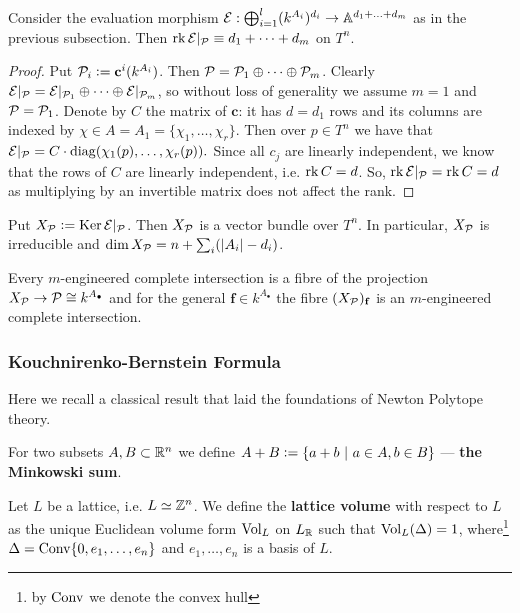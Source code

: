 \begin{claim}\label{claim:prelim_engin}
    Consider the evaluation morphism $\E : \bigoplus_{i = 1}^l (k^{A_i})^{d_i} \to \A^{d_1 + \hdots + d_m}$ as in the previous subsection. Then $\rk \E|_\P \equiv d_1 + \dots + d_m$ on $T^n$.
\end{claim}
\begin{proof}
Put $\P_i \defeq \mathbf c^i (k^{A_i})$. Then $\P = \P_1 \oplus \cdots \oplus \P_m$. Clearly $\E|_\P = \E|_{\P_1} \oplus \cdots \oplus \E|_{\P_m}$, so without loss of generality we assume $m = 1$ and $\P = \P_1$. Denote by $C$ the matrix of $\mathbf c$: it has $d = d_1$ rows and its columns are indexed by $\chi \in A = A_1 = \{ \chi_1, \dots, \chi_r \}$. Then over $p \in T^n$ we have that $\E|_\P = C \cdot \operatorname{diag}(\chi_1(p), \dots, \chi_r(p)).$ Since all $c_j$ are linearly independent, we know that the rows of $C$ are linearly independent, i.e. $\rk C = d$. So, $\rk \E|_\P = \rk C = d$ as multiplying by an invertible matrix does not affect the rank.
\end{proof}
\begin{corollary}
    Put $X_\P \defeq \Ker \E|_\P$. Then $X_\P$ is a vector bundle over $T^n$. In particular, $X_\P$ is irreducible and $\dim X_\P = n + \sum_i (|A_i| - d_i)$.
\end{corollary}

\begin{remark}
    Every $m$-engineered complete intersection is a fibre of the projection $X_\P \to \P \cong k^{A_\bullet}$ and for the general $\mathbf f \in k^{A_\bullet}$ the fibre $(X_\P)_{\mathbf f}$ is an $m$-engineered complete intersection.
\end{remark}

\subsubsection{Kouchnirenko-Bernstein Formula}
Here we recall a classical result that laid the foundations of Newton Polytope theory.
\begin{definition}
    For two subsets $A, B \subset \R^n$ we define $A + B \defeq \{ a + b\ |\ a \in A, b \in B\}$ --- \textbf{the Minkowski sum}.
\end{definition}

\begin{definition}
    Let $L$ be a lattice, i.e. $L \simeq \Z^n$. We define the \textbf{lattice volume} with respect to $L$ as the unique Euclidean volume form $\Vol_L$ on $L_\R$ such that $\Vol_L (\Delta) = 1$, where\footnote{by $\Conv$ we denote the convex hull} $\Delta = \Conv \{ 0, e_1, \dots, e_n \}$ and $e_1, \dots, e_n$ is a basis of $L$.
\end{definition}

